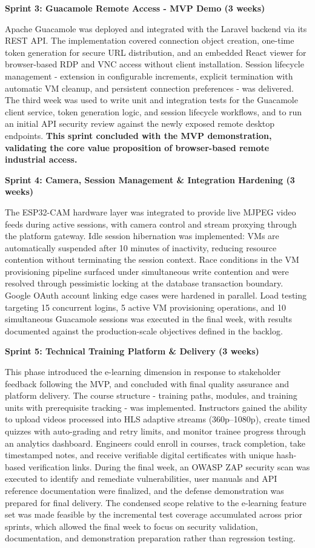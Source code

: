 \textbf{Sprint 3: Guacamole Remote Access - MVP Demo (3 weeks)}

Apache Guacamole was deployed and integrated with the Laravel backend via its REST
API. The implementation covered connection object creation, one-time token generation
for secure URL distribution, and an embedded React viewer for browser-based RDP and
VNC access without client installation. Session lifecycle management - extension in
configurable increments, explicit termination with automatic VM cleanup, and persistent
connection preferences - was delivered. The third week was used to write unit and
integration tests for the Guacamole client service, token generation logic, and session
lifecycle workflows, and to run an initial API security review against the newly exposed
remote desktop endpoints. \textbf{This sprint concluded with the MVP demonstration,
validating the core value proposition of browser-based remote industrial access.}

\textbf{Sprint 4: Camera, Session Management \& Integration Hardening (3 weeks)}

The ESP32-CAM hardware layer was integrated to provide live MJPEG video feeds
during active sessions, with camera control and stream proxying through
the platform gateway. Idle session hibernation was implemented: VMs are automatically
suspended after 10 minutes of inactivity, reducing resource contention without
terminating the session context. Race conditions in the VM provisioning pipeline
surfaced under simultaneous write contention and were resolved through pessimistic
locking at the database transaction boundary. Google OAuth account linking edge cases
were hardened in parallel. Load testing targeting 15 concurrent logins, 5 active VM provisioning
operations, and 10 simultaneous Guacamole sessions was executed in the final week,
with results documented against the production-scale objectives defined in the backlog.

\textbf{Sprint 5: Technical Training Platform \& Delivery (3 weeks)}

This phase introduced the e-learning dimension in response to stakeholder feedback
following the MVP, and concluded with final quality assurance and platform delivery.
The course structure - training paths, modules, and training units with prerequisite
tracking - was implemented. Instructors gained the ability to upload videos processed
into HLS adaptive streams (360p--1080p), create timed quizzes with auto-grading and
retry limits, and monitor trainee progress through an analytics dashboard. Engineers
could enroll in courses, track completion, take timestamped notes, and receive
verifiable digital certificates with unique hash-based verification links. During the
final week, an OWASP ZAP security scan was executed to identify and remediate
vulnerabilities, user manuals and API reference documentation were finalized, and the
defense demonstration was prepared for final delivery. The condensed scope relative to
the e-learning feature set was made feasible by the incremental test coverage
accumulated across prior sprints, which allowed the final week to focus on
security validation, documentation, and demonstration preparation rather than
regression testing.

